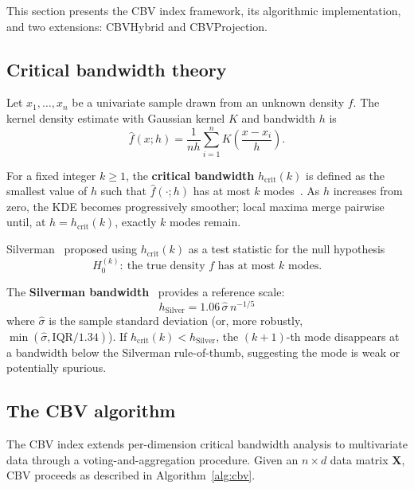 \documentclass[journal]{IEEEtran}
\begin{document}
This section presents the CBV index framework, its algorithmic implementation, and two extensions: CBVHybrid and CBVProjection.

\subsection{Critical bandwidth theory}
\label{sec:critical-bandwidth}

Let $x_1, \ldots, x_n$ be a univariate sample drawn from an unknown density $f$. The kernel density estimate with Gaussian kernel $K$ and bandwidth $h$ is
\begin{equation}
\hat{f}(x; h) = \frac{1}{nh} \sum_{i=1}^{n} K\!\left(\frac{x - x_i}{h}\right).
\label{eq:kde}
\end{equation}

For a fixed integer $k \geq 1$, the \textbf{critical bandwidth} $h_{\mathrm{crit}}(k)$ is defined as the smallest value of $h$ such that $\hat{f}(\cdot; h)$ has at most $k$ modes~\cite{silverman1981using}. As $h$ increases from zero, the KDE becomes progressively smoother; local maxima merge pairwise until, at $h = h_{\mathrm{crit}}(k)$, exactly $k$ modes remain.

Silverman~\cite{silverman1981using} proposed using $h_{\mathrm{crit}}(k)$ as a test statistic for the null hypothesis
\begin{equation}
H_0^{(k)}:\ \text{the true density } f \text{ has at most } k \text{ modes.}
\label{eq:null}
\end{equation}

The \textbf{Silverman bandwidth}~\cite{silverman1986density} provides a reference scale:
\begin{equation}
h_{\mathrm{Silver}} = 1.06 \, \hat{\sigma} \, n^{-1/5}
\label{eq:silverman}
\end{equation}
where $\hat{\sigma}$ is the sample standard deviation (or, more robustly, $\min(\hat{\sigma}, \mathrm{IQR}/1.34)$). If $h_{\mathrm{crit}}(k) < h_{\mathrm{Silver}}$, the $(k+1)$-th mode disappears at a bandwidth below the Silverman rule-of-thumb, suggesting the mode is weak or potentially spurious.

\subsection{The CBV algorithm}
\label{sec:cbv-algorithm}

The CBV index extends per-dimension critical bandwidth analysis to multivariate data through a voting-and-aggregation procedure. Given an $n \times d$ data matrix $\mathbf{X}$, CBV proceeds as described in Algorithm~\ref{alg:cbv}.
\end{document}
